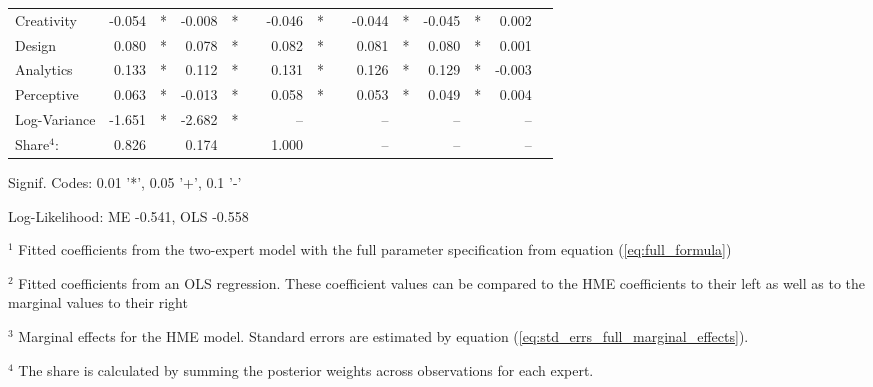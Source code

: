 \documentclass[12pt]{article}
\begin{document}
\begin{landscape}
\begin{table}
\begin{threeparttable}
\begin{tabular}[l]{l r l r l c r l c r l r l r l}
Creativity             & -0.054 & *      & -0.008 & *     && -0.046 & *     && -0.044 & *        & -0.045 & *        &  0.002 &        \\
Design                 &  0.080 & *      &  0.078 & *     &&  0.082 & *     &&  0.081 & *        &  0.080 & *        &  0.001 &        \\
Analytics              &  0.133 & *      &  0.112 & *     &&  0.131 & *     &&  0.126 & *        &  0.129 & *        & -0.003 &        \\
Perceptive             &  0.063 & *      & -0.013 & *     &&  0.058 & *     &&  0.053 & *        &  0.049 & *        &  0.004 &        \\
Log-Variance           & -1.651 & *      & -2.682 & *     &&  --    &       &&  --    &          &  --    &          &  --    &        \\
                \cmidrule(l){2-3} \cmidrule(l){4-5} \cmidrule(l){7-8} \cmidrule(l){10-11} \cmidrule(l){12-13} \cmidrule(l){14-15}
Share$^{4}$:          &  0.826 &        &  0.174 &       &&  1.000 &       &&  --    &          &  --    &          &  --    &        \\
\cmidrule{1-15}
      \end{tabular}

      \begin{tablenotes}
        \item Signif. Codes: 0.01 '*', 0.05 '+', 0.1 '-'
        \item Log-Likelihood: ME -0.541, OLS -0.558
        \item $^{1}$ Fitted coefficients from the two-expert model with the full parameter specification from equation (\ref{eq:full_formula})
        \item $^{2}$ Fitted coefficients from an OLS regression. These coefficient values can be compared to the HME coefficients to their left as well as to the marginal values to their right
        \item $^{3}$ Marginal effects for the HME model. Standard errors are estimated by equation (\ref{eq:std_errs_full_marginal_effects}).
        \item $^{4}$ The share is calculated by summing the posterior weights across observations for each expert.

      \end{tablenotes} \label{tbl:2E_full_regressions_results}


    \end{threeparttable}

\end{table}
\end{landscape}
\end{document}
